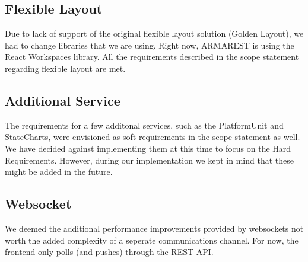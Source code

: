 \subsection*{Flexible Layout}
Due to lack of support of the original flexible layout solution (Golden Layout), we had to change libraries that we are using. Right now, ARMAREST is using the React Workspaces library. All the requirements described in the scope statement regarding flexible layout are met.

\subsection*{Additional Service}
The requirements for a few additonal services, such as the PlatformUnit and StateCharts, were envisioned as soft requirements in the scope statement as well.
We have decided against implementing them at this time to focus on the Hard Requirements. However, during our implementation we kept in mind that these might be added in the future.

\subsection*{Websocket}
We deemed the additional performance improvements provided by websockets not worth the added complexity of a seperate communications channel.
For now, the frontend only polls (and pushes) through the REST API.
